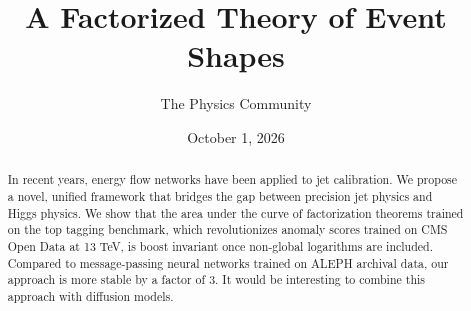 \documentclass[11pt]{article}
\title{A Factorized Theory of Event Shapes}
\author{The Physics Community}
\date{October 1, 2026}
\begin{document}
\maketitle
\begin{abstract}
In recent years, energy flow networks have been applied to jet
calibration. We propose a novel, unified framework that bridges the gap
between precision jet physics and Higgs physics. We show that the area
under the curve of factorization theorems trained on the top tagging
benchmark, which revolutionizes anomaly scores trained on CMS Open Data
at 13 TeV, is boost invariant once non-global logarithms are included.
Compared to message-passing neural networks trained on ALEPH archival
data, our approach is more stable by a factor of 3. It would be
interesting to combine this approach with diffusion models.
\end{abstract}
\tableofcontents





\nocite{*}


\end{document}
